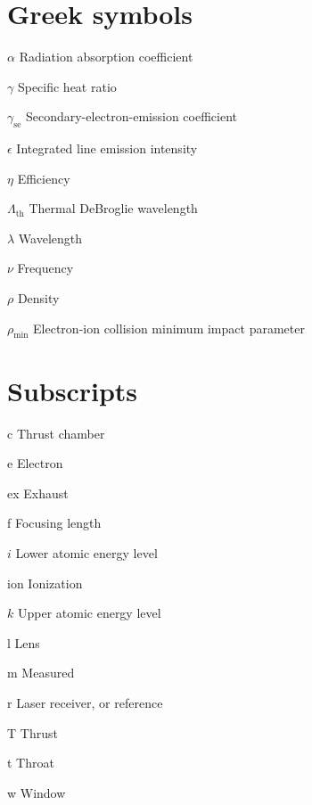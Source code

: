 \begin{multicols}{2}
    \section*{Greek symbols}
    \begin{nomlist}
        \item[$\alpha$]         Radiation absorption coefficient %
        \item[$\gamma$]         Specific heat ratio
        \item[$\gamma_\mathrm{se}$]         Secondary-electron-emission coefficient
        \item[$\epsilon$]       Integrated line emission intensity 
        \item[$\eta$]           Efficiency 
        \item[$\Lambda_\mathrm{th}$]        Thermal DeBroglie wavelength
        \item[$\lambda$]        Wavelength
        \item[$\nu$]            Frequency
        \item[$\rho$]           Density
        \item[$\rho_\mathrm{min}$]  Electron-ion collision minimum impact parameter
    \end{nomlist}

    \section*{Subscripts}
    \begin{nomlist}
        \item[c]                Thrust chamber
        \item[e]                Electron
        \item[ex]               Exhaust
        \item[f]                Focusing length
        \item[$i$]              Lower atomic energy level 
        \item[ion]              Ionization
        \item[$k$]              Upper atomic energy level 
        \item[l]                Lens
        \item[m]                Measured
        \item[r]                Laser receiver, or reference
        \item[T]                Thrust
        \item[t]                Throat
        \item[w]                Window
    \end{nomlist}


\end{multicols}